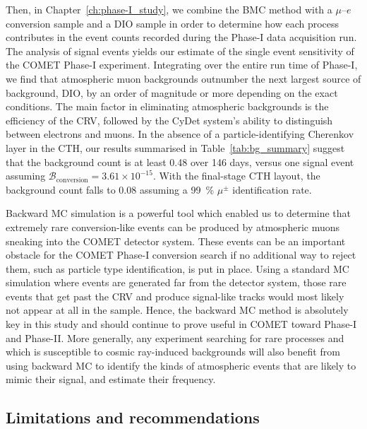 Then, in Chapter~\ref{ch:phase-I_study}, we combine the BMC method with a
$\mu$--$e$ conversion sample and a DIO sample in order to determine how each
process contributes in the event counts recorded during the Phase\nobreakdash-I data
acquisition run. The analysis of signal events yields our estimate of the single
event sensitivity of the COMET Phase\nobreakdash-I experiment. Integrating over the entire
run time of Phase\nobreakdash-I, we find that atmospheric muon backgrounds outnumber the
next largest source of background, DIO, by an order of magnitude or more
depending on the exact conditions. The main factor in eliminating atmospheric
backgrounds is the efficiency of the CRV, followed by the CyDet system's ability
to distinguish between electrons and muons. In the absence of a
particle-identifying Cherenkov layer in the CTH, our results summarised in
Table~\ref{tab:bg_summary} suggest that the background count is at least 0.48
over 146 days, versus one signal event assuming $\mathcal{B}_\mathrm{conversion}
= 3.61 \times 10^{-15}$. With the final-stage CTH layout, the background count
falls to 0.08 assuming a \SI{99}{\percent} $\mu^\pm$ identification rate.


Backward MC simulation is a powerful tool which enabled us to determine that
extremely rare conversion-like events can be produced by atmospheric muons
sneaking into the COMET detector system. These events can be an important
obstacle for the COMET Phase\nobreakdash-I conversion search if no additional way to
reject them, such as particle type identification, is put in place. Using a
standard MC simulation where events are generated far from the detector system,
those rare events that get past the CRV and produce signal-like tracks would
most likely not appear at all in the sample. Hence, the backward MC method is
absolutely key in this study and should continue to prove useful in COMET toward
Phase\nobreakdash-I and Phase\nobreakdash-II. More generally, any experiment searching for rare
processes and which is susceptible to cosmic ray-induced backgrounds will also
benefit from using backward MC to identify the kinds of atmospheric events that
are likely to mimic their signal, and estimate their frequency.

\subsection{Limitations and recommendations}


